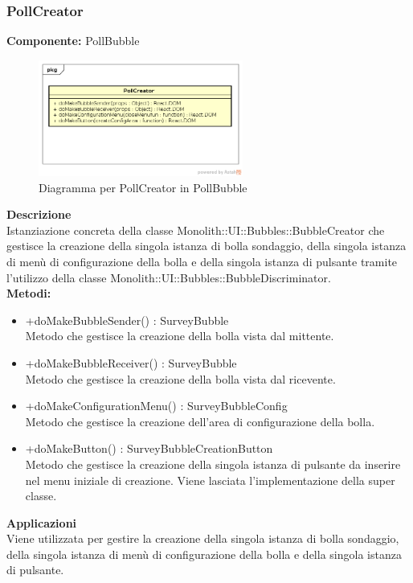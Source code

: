 \clearpage

\subsubsection{PollCreator}
\textbf{Componente:}  PollBubble\\
   \FloatBarrier
   \begin{figure}[ht]
   \centering
   \includegraphics[width=0.6\textwidth]{img/single-PollCreator.png}
   \caption{{Diagramma per PollCreator in PollBubble}}
\end{figure}
\FloatBarrier
\textbf{Descrizione}\\
Istanziazione concreta della classe Monolith::UI::Bubbles::BubbleCreator che gestisce la creazione della singola istanza di bolla sondaggio, della singola istanza di menù di configurazione della bolla e della singola istanza di pulsante tramite l'utilizzo della classe Monolith::UI::Bubbles::BubbleDiscriminator.
\\
\textbf{Metodi:} 
\begin{itemize}
\item +doMakeBubbleSender() : SurveyBubble 
\\
Metodo che gestisce la creazione della bolla vista dal mittente.
\item +doMakeBubbleReceiver() : SurveyBubble 
\\
Metodo che gestisce la creazione della bolla vista dal ricevente.
\item +doMakeConfigurationMenu() : SurveyBubbleConfig 
\\
Metodo che gestisce la creazione dell'area di configurazione della bolla.
\item +doMakeButton() : SurveyBubbleCreationButton 
\\
Metodo che gestisce la creazione della singola istanza di pulsante da inserire nel menu iniziale di creazione. Viene lasciata l'implementazione della super classe.
\end{itemize} 


\textbf{Applicazioni}\\
Viene utilizzata per gestire la creazione della singola istanza di bolla sondaggio, della singola istanza di menù di configurazione della bolla e della singola istanza di pulsante. 


